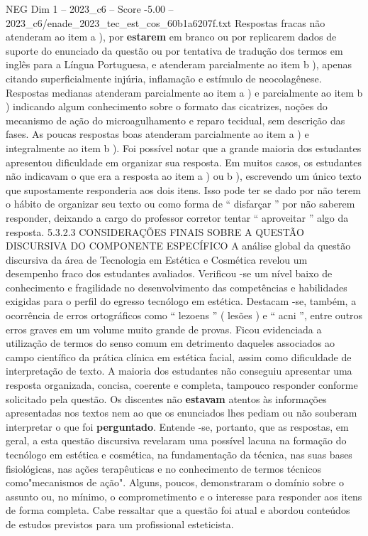 \begin{textsample}{NEG Dim 1 – 2023\_c6 – Score -5.00 – 2023\_c6/enade\_2023\_tec\_est\_cos\_60b1a6207f.txt}
Respostas fracas não atenderam ao item a ), por \textbf{estarem} em branco ou por replicarem dados de suporte do enunciado da questão ou por tentativa de tradução dos termos em inglês para a Língua Portuguesa, e atenderam parcialmente ao item b ), apenas citando superficialmente injúria, inflamação e estímulo de neocolagênese.
Respostas medianas atenderam parcialmente ao item a ) e parcialmente ao item b ) indicando algum conhecimento sobre o formato das cicatrizes, noções do mecanismo de ação do microagulhamento e reparo tecidual, sem descrição das fases.
As poucas respostas boas atenderam parcialmente ao item a ) e integralmente ao item b ).
Foi possível notar que a grande maioria dos estudantes apresentou dificuldade em organizar sua resposta.
Em muitos casos, os estudantes não indicavam o que era a resposta ao item a ) ou b ), escrevendo um único texto que supostamente responderia aos dois itens.
Isso pode ter se dado por não terem o hábito de organizar seu texto ou como forma de “ disfarçar ” por não saberem responder, deixando a cargo do professor corretor tentar “ aproveitar ” algo da resposta. 5.3.2.3 CONSIDERAÇÕES FINAIS SOBRE A QUESTÃO DISCURSIVA DO COMPONENTE ESPECÍFICO A análise global da questão discursiva da área de Tecnologia em Estética e Cosmética revelou um desempenho fraco dos estudantes avaliados.
Verificou -se um nível baixo de conhecimento e fragilidade no desenvolvimento das competências e habilidades exigidas para o perfil do egresso tecnólogo em estética.
Destacam -se, também, a ocorrência de erros ortográficos como “ lezoens ” ( lesões ) e “ acni ”, entre outros erros graves em um volume muito grande de provas.
Ficou evidenciada a utilização de termos do senso comum em detrimento daqueles associados ao campo científico da prática clínica em estética facial, assim como dificuldade de interpretação de texto.
A maioria dos estudantes não conseguiu apresentar uma resposta organizada, concisa, coerente e completa, tampouco responder conforme solicitado pela questão.
Os discentes não \textbf{estavam} atentos às informações apresentadas nos textos nem ao que os enunciados lhes pediam ou não souberam interpretar o que foi \textbf{perguntado}.
Entende -se, portanto, que as respostas, em geral, a esta questão discursiva revelaram uma possível lacuna na formação do tecnólogo em estética e cosmética, na fundamentação da técnica, nas suas bases fisiológicas, nas ações terapêuticas e no conhecimento de termos técnicos como"mecanismos de ação".
Alguns, poucos, demonstraram o domínio sobre o assunto ou, no mínimo, o comprometimento e o interesse para responder aos itens de forma completa.
Cabe ressaltar que a questão foi atual e abordou conteúdos de estudos previstos para um profissional esteticista.

\end{textsample}
